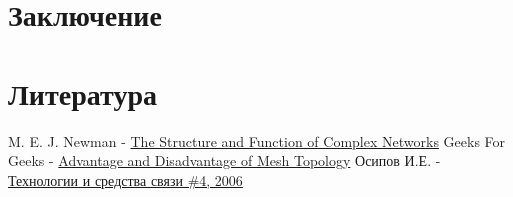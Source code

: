 \documentclass[a4paper]{article}
\begin{document}
\section{Заключение}
\section{Литература}

\begin{thebibliography}{}
      M. E. J. Newman -  \href{https://github.com/julproh/Thesis}{The Structure and Function of Complex Networks}
      Geeks For Geeks -  \href{https://www.geeksforgeeks.org/advantage-and-disadvantage-of-mesh-topology/}{Advantage and Disadvantage of Mesh Topology}
      Осипов И.Е. -  \href{http://lib.tssonline.ru/articles2/fix-op/mesh_seti_techn_prilozh_oborud}{Технологии и средства связи \#4, 2006}
\end{thebibliography}
\end{document}
